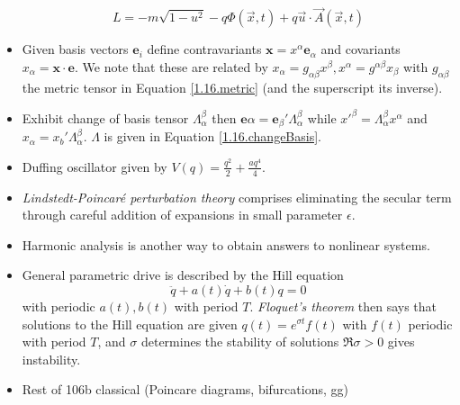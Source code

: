 \documentclass[10pt]{report}
\begin{document}
\begin{itemize}
        $$L = -m\sqrt{1-u^2} - q\Phi(\vec{x},t) + q\vec{u}\cdot \vec{A}(\vec{x},t)$$
    \item Given basis vectors $\mathbf{e}_i$ define contravariants $\mathbf{x} = x^\alpha \mathbf{e}_\alpha$ and covariants $x_\alpha = \mathbf{x}\cdot \mathbf{e}$. We note that these are related by $x_\alpha = g_{\alpha\beta}x^\beta, x^\alpha = g^{\alpha\beta}x_\beta$ with $g_{\alpha\beta}$ the metric tensor in Equation \eqref{1.16.metric} (and the superscript its inverse).
    \item Exhibit change of basis tensor $\Lambda_\alpha^\beta$ then $\mathbf{e}\alpha = \mathbf{e}_\beta'\Lambda_\alpha^\beta$ while $x'^\beta = \Lambda_\alpha^\beta x^\alpha$ and $x_\alpha = x_b' \Lambda_\alpha^\beta$. $\Lambda$ is given in Equation \eqref{1.16.changeBasis}. 
    \item Duffing oscillator given by $V(q) = \frac{q^2}{2} + \frac{aq^4}{4}$. 
    \item \emph{Lindstedt-Poincar\'e perturbation theory} comprises eliminating the secular term through careful addition of expansions in small parameter $\epsilon$. 
    \item Harmonic analysis is another way to obtain answers to nonlinear systems. 
    \item General parametric drive is described by the Hill equation 
        $$\ddot{q} + a(t)\dot{q} + b(t)q = 0$$
        with periodic $a(t), b(t)$ with period $T$. \emph{Floquet's theorem} then says that solutions to the Hill equation are given $q(t) = e^{\sigma t}f(t)$ with $f(t)$ periodic with period $T$, and $\sigma$ determines the stability of solutions $\Re \sigma > 0$ gives instability.
    \item Rest of 106b classical (Poincare diagrams, bifurcations, gg)
\end{itemize}
\end{document}
